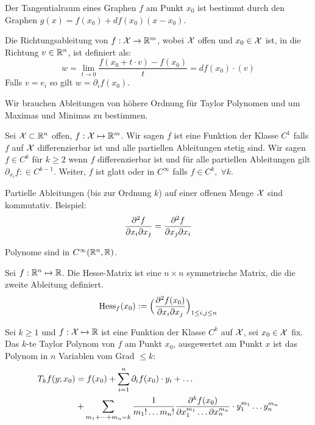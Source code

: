 
Der Tangentialraum eines Graphen $f$ am Punkt $x_0$ ist bestimmt durch den Graphen $g(x) = f(x_0) + df(x_0)(x-x_0)$.



Die Richtungsableitung von $f: \mathcal{X} \to \mathbb{R}^m$, wobei $\mathcal{X}$ offen und $x_0 \in \mathcal{X}$ ist, in die Richtung $v \in \mathbb{R}^n$, ist definiert als:
$$w = \lim_{t \to 0} \frac{f(x_0 + t \cdot v) - f(x_0)}{t} = df(x_0) \cdot (v)$$
Falls $v = e_i$ so gilt $w = \partial_i f(x_0)$.



Wir brauchen Ableitungen von höhere Ordnung für Taylor Polynomen und um Maximas und Minimas
zu bestimmen. \medskip

Sei $\mathcal{X} \subset \mathbb{R}^n$ offen, $f: \mathcal{X} \mapsto \mathbb{R}^m$. Wir sagen $f$ ist eine Funktion der Klasse $C^1$ falls $f$ 
auf $\mathcal{X}$ differenzierbar ist und alle partiellen Ableitungen stetig sind. Wir sagen $f \in C^k$ für $k \geq 2$
wenn $f$ differenzierbar ist und für alle partiellen Ableitungen gilt $\partial_{x_i} f : \in C^{k-1}$. 
Weiter, $f$ ist glatt oder in $C^\infty$ falls $f \in C^k, \; \forall k$. \medskip


\vfill\null
\columnbreak


Partielle Ableitungen (bis zur Ordnung $k$) auf einer offenen Menge $\mathcal{X}$ sind kommutativ. Beispiel:
$$\pdv{^2 f}{x_i \partial x_j} = \pdv{^2 f}{ x_j \partial x_i}$$

Polynome sind in $C^\infty (\mathbb{R}^n, \mathbb{R})$.



Sei $f : \mathbb{R}^n \mapsto \mathbb{R}$. Die Hesse-Matrix ist eine $n \times n$ symmetrische Matrix, 
die die zweite Ableitung definiert.
$$\text{Hess}_f(x_0) := \Big( \pdv{^2 f(x_0)}{x_i \partial x_j} \Big)_{1 \leq i, j \leq n}$$



Sei $k \geq 1$ und $f: \mathcal{X} \mapsto \mathbb{R}$ ist eine Funktion der Klasse $C^k$ auf $\mathcal{X}$, sei $x_0 \in \mathcal{X}$ fix. Das $k$-te Taylor Polynom
von $f$ am Punkt $x_0$, ausgewertet am Punkt $x$ ist das Polynom in $n$ Variablen vom Grad $\leq k$:
\begin{align*}
  T_k f(y; x_0) &= f(x_0) + \sum_{i=1}^n \partial_i f(x_0) \cdot y_i + \dots \\
  &+ \sum_{m_1 + \dots + m_n = k} \frac{1}{m_1! \dots m_n!} \pdv{^k f(x_0) }{x_1^{m_1} \dots \partial x_n^{m_n}} \cdot y_1^{m_1} \dots y_n^{m_n}
\end{align*}

